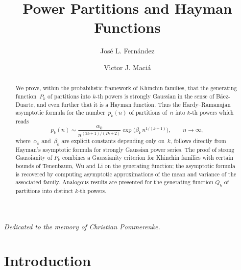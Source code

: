 \documentclass[12pt]{amsart}
\theoremstyle{definition}
\begin{document}
\title{Power Partitions and Hayman Functions}

\author{Jos\'e L. Fern\'andez}
\address{Departamento de Matem\'aticas, Universidad Aut\'onoma de Madrid, Madrid, Spain and Fundaci\'on Akusmatika.}

\author{V\'{\i}ctor J. Maci\'a}
\address{Departamento de An\'alisis Matem\'atico, Universidad de La Laguna, Tenerife, Spain.}




\begin{abstract}
We prove, within the probabilistic framework of Khinchin families, that
the generating function~$P_k$ of partitions into $k$-th powers is strongly Gaussian in the
sense of B\'aez-Duarte, and even further that it is a Hayman function. Thus the
Hardy--Ramanujan asymptotic formula for the number~$p_k(n)$ of partitions of~$n$ into
$k$-th powers which reads
\[
p_k(n) \sim \frac{\alpha_k}{n^{(3k+1)/(2k+2)}} \exp\!\Big(\beta_k\, n^{1/(k+1)}\Big), \qquad n\to\infty,
\]
where~$\alpha_k$ and~$\beta_k$ are explicit constants depending only on~$k$, follows directly from
Hayman's asymptotic formula for strongly Gaussian power series. The proof of strong
Gaussianity of $P_k$ combines a Gaussianity criterion for Khinchin families with certain bounds of
Tenenbaum, Wu and Li on the generating function; the asymptotic formula is recovered
by computing asymptotic approximations of the mean and variance of the associated
family. Analogous results are presented for the generating function $Q_k$ of partitions into distinct $k$-th powers.
\end{abstract}




\maketitle

\vspace{-1.1em}
\begin{flushright}
	\itshape Dedicated to the memory of Christian Pommerenke.
\end{flushright}



\section*{Introduction}
\end{document}
